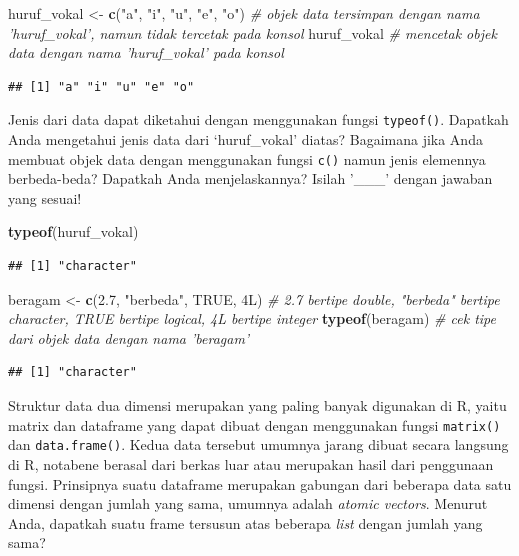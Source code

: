 \documentclass[]{article}
\newenvironment{Shaded}{\begin{snugshade}}{\end{snugshade}}
\newcommand{\KeywordTok}[1]{\textcolor[rgb]{0.13,0.29,0.53}{\textbf{#1}}}
\newcommand{\FloatTok}[1]{\textcolor[rgb]{0.00,0.00,0.81}{#1}}
\newcommand{\StringTok}[1]{\textcolor[rgb]{0.31,0.60,0.02}{#1}}
\newcommand{\CommentTok}[1]{\textcolor[rgb]{0.56,0.35,0.01}{\textit{#1}}}
\newcommand{\OtherTok}[1]{\textcolor[rgb]{0.56,0.35,0.01}{#1}}
\newcommand{\NormalTok}[1]{#1}
\begin{document}
\begin{Shaded}
\begin{Highlighting}[]
\NormalTok{huruf_vokal <-}\StringTok{ }\KeywordTok{c}\NormalTok{(}\StringTok{"a"}\NormalTok{, }\StringTok{"i"}\NormalTok{, }\StringTok{"u"}\NormalTok{, }\StringTok{"e"}\NormalTok{, }\StringTok{"o"}\NormalTok{) }\CommentTok{# objek data tersimpan dengan nama 'huruf_vokal', namun tidak tercetak pada konsol}
\NormalTok{huruf_vokal }\CommentTok{# mencetak objek data dengan nama 'huruf_vokal' pada konsol}
\end{Highlighting}
\end{Shaded}

\begin{verbatim}
## [1] "a" "i" "u" "e" "o"
\end{verbatim}

Jenis dari data dapat diketahui dengan menggunakan fungsi
\texttt{typeof()}. Dapatkah Anda mengetahui jenis data dari
`huruf\_vokal' diatas? Bagaimana jika Anda membuat objek data dengan
menggunakan fungsi \texttt{c()} namun jenis elemennya berbeda-beda?
Dapatkah Anda menjelaskannya? Isilah '\_\_\_' dengan jawaban yang
sesuai!

\begin{Shaded}
\begin{Highlighting}[]
\KeywordTok{typeof}\NormalTok{(huruf_vokal)}
\end{Highlighting}
\end{Shaded}

\begin{verbatim}
## [1] "character"
\end{verbatim}

\begin{Shaded}
\begin{Highlighting}[]
\NormalTok{beragam <-}\StringTok{ }\KeywordTok{c}\NormalTok{(}\FloatTok{2.7}\NormalTok{, }\StringTok{"berbeda"}\NormalTok{, }\OtherTok{TRUE}\NormalTok{, 4L) }\CommentTok{# 2.7 bertipe double, "berbeda" bertipe character, TRUE bertipe logical, 4L bertipe integer}
\KeywordTok{typeof}\NormalTok{(beragam) }\CommentTok{# cek tipe dari objek data dengan nama 'beragam'}
\end{Highlighting}
\end{Shaded}

\begin{verbatim}
## [1] "character"
\end{verbatim}

Struktur data dua dimensi merupakan yang paling banyak digunakan di R,
yaitu matrix dan dataframe yang dapat dibuat dengan menggunakan fungsi
\texttt{matrix()} dan \texttt{data.frame()}. Kedua data tersebut umumnya
jarang dibuat secara langsung di R, notabene berasal dari berkas luar
atau merupakan hasil dari penggunaan fungsi. Prinsipnya suatu dataframe
merupakan gabungan dari beberapa data satu dimensi dengan jumlah yang
sama, umumnya adalah \emph{atomic vectors}. Menurut Anda, dapatkah suatu
frame tersusun atas beberapa \emph{list} dengan jumlah yang sama?
\end{document}
